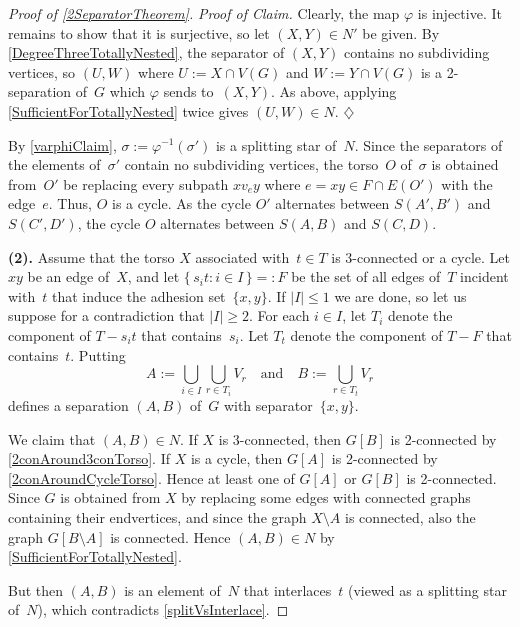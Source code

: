 \documentclass{aic}
\newenvironment{cproof}{\noindent\textit{Proof of Claim.}}{\phantom{!}\!\hfill$\diamondsuit$}
\theoremstyle{plain}
\theoremstyle{definition}
\theoremstyle{plain}
\theoremstyle{plain}
\newcommand{\sm}{\setminus}
\renewcommand{\le}{\leqslant}
\renewcommand{\ge}{\geqslant}
\begin{document}
\begin{proof}[Proof of \autoref{2SeparatorTheorem}]
\begin{cproof}
Clearly, the map $\varphi$ is injective.
It remains to show that it is surjective, so let $(X,Y)\in N'$ be given.
By \autoref{DegreeThreeTotallyNested}, the separator of $(X,Y)$ contains no subdividing vertices, so $(U,W)$ where $U:=X\cap V(G)$ and $W:=Y\cap V(G)$ is a 2-separation of~$G$ which $\varphi$ sends to~$(X,Y)$.
As above, applying \autoref{SufficientForTotallyNested} twice gives $(U,W)\in N$.
\end{cproof}\medskip

By \autoref{varphiClaim}, $\sigma:=\varphi^{-1}(\sigma')$ is a splitting star of~$N$.
Since the separators of the elements of~$\sigma'$ contain no subdividing vertices, the torso~$O$ of~$\sigma$ is obtained from~$O'$ be replacing every subpath $x v_e y$ where $e=xy\in F\cap E(O')$ with the edge~$e$.
Thus, $O$ is a cycle.
As the cycle $O'$ alternates between $S(A',B')$ and $S(C',D')$, the cycle $O$ alternates between $S(A,B)$ and $S(C,D)$.
\medskip

\textbf{(2).} Assume that the torso $X$ associated with~$t\in T$ is 3-connected or a cycle. 
Let $xy$ be an edge of~$X$, and let $\{\,s_i t : i\in I\,\}=:F$ be the set of all edges of~$T$ incident with~$t$ that induce the adhesion set~$\{x,y\}$.
If $|I|\le 1$ we are done, so let us suppose for a contradiction that $|I|\ge 2$.
For each $i\in I$, let $T_i$ denote the component of $T-s_i t$ that contains~$s_i$.
Let $T_t$ denote the component of $T-F$ that contains~$t$.
Putting
\[
    A:=\bigcup_{i\in I}\bigcup_{r\in T_i}V_r\quad\text{and}\quad B:=\bigcup_{r\in T_t}V_r
\]
defines a separation $(A,B)$ of~$G$ with separator~$\{x,y\}$.

We claim that $(A,B)\in N$.
If $X$ is 3-connected, then $G[B]$ is 2-connected by \autoref{2conAround3conTorso}.
If $X$ is a cycle, then $G[A]$ is 2-connected by \autoref{2conAroundCycleTorso}.
Hence at least one of $G[A]$ or $G[B]$ is 2-connected.
Since $G$ is obtained from $X$ by replacing some edges with connected graphs containing their endvertices, and since the graph $X\sm A$ is connected, also the graph $G[B\sm A]$ is connected.
Hence $(A,B)\in N$ by \autoref{SufficientForTotallyNested}.

But then $(A,B)$ is an element of~$N$ that interlaces~$t$ (viewed as a splitting star of~$N$), which contradicts \autoref{splitVsInterlace}.
\end{proof}

\end{document}
